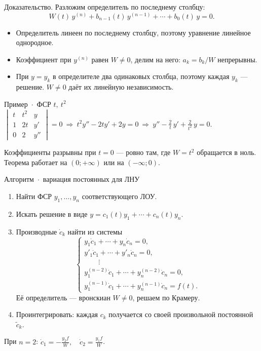 \documentclass[12pt,a4paper]{article}
\newenvironment{openingformula}{\centering\(\displaystyle}{\)\par}
\begin{document}
\begin{reasoning}{Доказательство.}
Разложим определитель по последнему столбцу:
\[
 W(t)\,y^{(n)}+b_{n-1}(t)\,y^{(n-1)}+\cdots+b_0(t)\,y=0.
\]
\begin{itemize}
\item Определитель линеен по последнему столбцу, поэтому уравнение линейное однородное.
\item Коэффициент при \(y^{(n)}\) равен \(W\ne0\), делим на него: \(a_k=b_k/W\) непрерывны.
\item При \(y=y_k\) в определителе два одинаковых столбца, поэтому каждая \(y_k\) — решение. \(W\ne0\) даёт их линейную независимость.
\end{itemize}

\end{reasoning}

\begin{example}{Пример~\(\cdot\)~ФСР \(t,\ t^2\)}
\begin{openingformula}
 \begin{vmatrix}t&t^2&y\\1&2t&y'\\0&2&y''\end{vmatrix}=0
 \ \Rightarrow\ t^2y''-2ty'+2y=0
 \ \Rightarrow\ y''-\frac{2}{t}\,y'+\frac{2}{t^2}\,y=0.
\end{openingformula}
Коэффициенты разрывны при \(t=0\) — ровно там, где \(W=t^2\) обращается в ноль. Теорема работает на \((0;+\infty)\) или на \((-\infty;0)\).
\end{example}

\begin{result}{Алгоритм~\(\cdot\)~вариация постоянных для ЛНУ}
\begin{enumerate}
\item Найти ФСР \(y_1,\ldots,y_n\) соответствующего ЛОУ.
\item Искать решение в виде \(y=c_1(t)y_1+\cdots+c_n(t)y_n\).
\item Производные \(\dot c_k\) найти из системы
\[
 \begin{cases}
 y_1\dot c_1+\cdots+y_n\dot c_n=0,\\
 y'_1\dot c_1+\cdots+y'_n\dot c_n=0,\\
 \qquad\vdots\\
 y_1^{(n-2)}\dot c_1+\cdots+y_n^{(n-2)}\dot c_n=0,\\
 y_1^{(n-1)}\dot c_1+\cdots+y_n^{(n-1)}\dot c_n=f(t).
 \end{cases}
\]
Её определитель — вронскиан \(W\ne0\), решаем по Крамеру.
\item Проинтегрировать: каждая \(c_k\) получается со своей произвольной постоянной \(\tilde c_k\).
\end{enumerate}
При \(n=2\): \(\displaystyle\dot c_1=-\frac{y_2 f}{W},\quad\dot c_2=\frac{y_1 f}{W}\).
\end{result}
\end{document}
